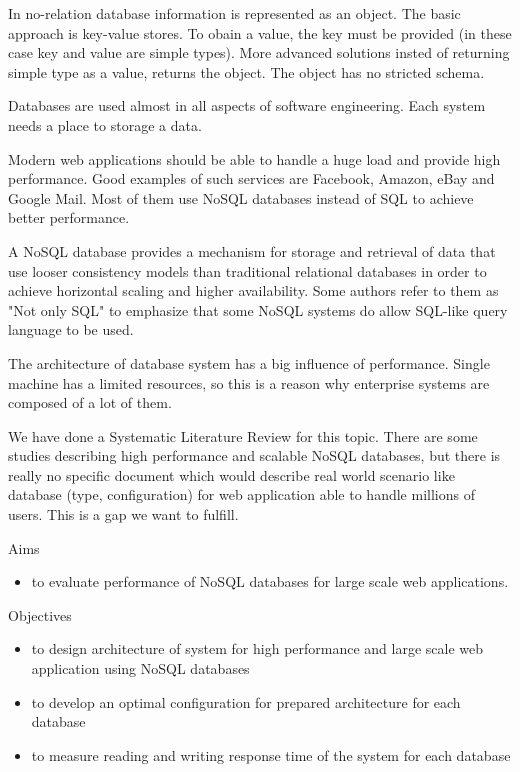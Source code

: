 \documentclass[times, 10pt,twocolumn]{article}
\begin{document}
In no-relation database information is represented as an object.
The basic approach is key-value stores. To obain a value, the key must be
provided (in these case key and value are simple types). More
advanced solutions insted of returning simple type as a value, returns 
the object. The object has no stricted schema.



Databases are used almost in all aspects of software engineering. Each 
system needs a place to storage a data. 

Modern web applications should be able to handle a huge load and provide high performance. 
Good examples of such services are Facebook, Amazon, eBay and Google Mail. Most of them use NoSQL databases
instead of SQL to achieve better performance.

A NoSQL database provides a mechanism for storage and retrieval of data that use looser consistency models 
than traditional relational databases in order to achieve horizontal scaling and higher availability. Some authors 
refer to them as "Not only SQL" to emphasize that some NoSQL systems do allow SQL-like query language to be used.

The architecture of database system has a big influence of performance. Single machine has a limited
resources, so this is a reason why enterprise systems are composed of a lot of them.

We have done a Systematic Literature Review for this topic. There are some studies describing high performance 
and scalable NoSQL databases, but there is really no specific document which would describe real world scenario like 
database (type, configuration) for web application able to handle millions of users. This is a gap we want to fulfill.


Aims
\begin{itemize}
	\item to evaluate performance of NoSQL databases for large scale web applications.
\end{itemize}

Objectives
\begin{itemize}
	\item to design architecture of system for high performance and large scale web application using NoSQL databases
	\item to develop an optimal configuration for prepared architecture for each database
	\item to measure reading and writing response time of the system for each database
\end{itemize}
\end{document}
